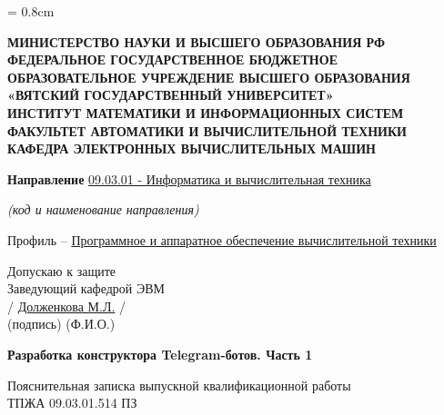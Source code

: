 \begin{titlepage}
	\newpage
	\singlespacing
	\topskip = 0.8cm
	\large

	\begin{center}
		\large
		\bfseries
		МИНИСТЕРСТВО НАУКИ И ВЫСШЕГО ОБРАЗОВАНИЯ РФ \\
		ФЕДЕРАЛЬНОЕ ГОСУДАРСТВЕННОЕ БЮДЖЕТНОЕ \\
		ОБРАЗОВАТЕЛЬНОЕ УЧРЕЖДЕНИЕ ВЫСШЕГО ОБРАЗОВАНИЯ \\
		«ВЯТСКИЙ ГОСУДАРСТВЕННЫЙ УНИВЕРСИТЕТ» \\
		ИНСТИТУТ МАТЕМАТИКИ И ИНФОРМАЦИОННЫХ СИСТЕМ \\
		ФАКУЛЬТЕТ АВТОМАТИКИ И ВЫЧИСЛИТЕЛЬНОЙ ТЕХНИКИ \\
		КАФЕДРА ЭЛЕКТРОННЫХ ВЫЧИСЛИТЕЛЬНЫХ МАШИН
	\end{center}

	\vspace{0.8cm}
	\begin{center}
		\textbf{Направление}
		\uline{09.03.01 - Информатика и вычислительная техника}

		\small
		\textit{(код и наименование направления)}

		\large
		Профиль – \uline{Программное и аппаратное обеспечение вычислительной техники}
	\end{center}

	\vspace{0.8cm}
	\begin{flushright}
		Допускаю к защите \\
		Заведующий кафедрой ЭВМ \\
		\vspace{1mm}
		\uline{\hspace{3cm}} / \uline{Долженкова М.Л.} / \\
		\vspace{1mm}
		\small
		(подпись) \hspace{2.5cm} (Ф.И.О.) \hspace{1.5cm}

	\end{flushright}

	\vspace{1.5cm}
	\begin{center}
		\huge
		\bfseries
		Разработка конструктора Telegram-ботов. Часть 1
	\end{center}

	\vspace{0.5cm}
	\begin{center}
		Пояснительная записка выпускной квалификационной работы \\
		ТПЖА 09.03.01.514 ПЗ
	\end{center}


\end{titlepage}
